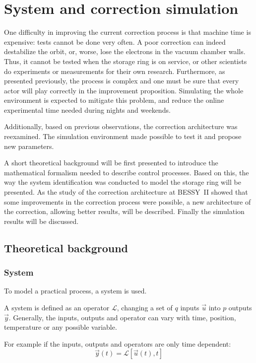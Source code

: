 
\chapter{System and correction simulation}
\label{sec:control}
One difficulty in improving the current correction process is that machine time is expensive: tests cannot be done very often. A poor correction can indeed destabilize the orbit, or, worse, lose the electrons in the vacuum chamber walls. Thus, it cannot be tested when the storage ring is on service, or other scientists do experiments or measurements for their own research. Furthermore, as presented previously, the process is complex and one must be sure that every actor will play correctly in the improvement proposition. Simulating the whole environment is expected to mitigate this problem, and reduce the online experimental time needed during nights and weekends.

Additionally, based on previous observations, the correction architecture was reexamined. The simulation environment made possible to test it and propose new parameters.

A short theoretical background will be first presented to introduce the mathematical formalism needed to describe control processes. Based on this, the way the system identification was conducted to model the storage ring will be presented. As the study of the correction architecture at BESSY~II showed that some improvements in the correction process were possible, a new architecture of the correction, allowing better results, will be described. Finally the simulation results will be discussed.

\section{Theoretical background}
\subsection{System}
To model a practical process, a system is used. 

A system is defined as an operator $\mathcal{L}$, changing a set of $q$ inputs $\vec{u}$ into $p$ outputs $\vec{y}$. Generally, the inputs, outputs and operator can vary with time, position, temperature or any possible variable.

For example if the inputs, outputs and operators are only time dependent:
\begin{equation}
	\vec{y}(t) = \mathcal{L}[\vec{u}(t),t]
\end{equation}


